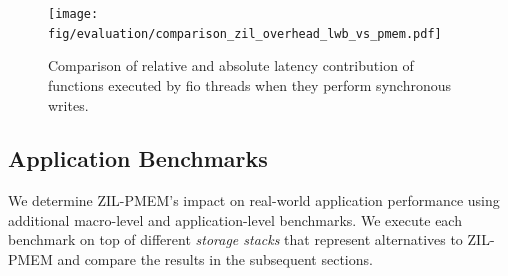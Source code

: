 \documentclass[12pt,a4paper,twoside]{book}
\begin{document}
\begin{figure}[H]
    \centering
    \texttt{[image: fig/evaluation/comparison\_zil\_overhead\_lwb\_vs\_pmem.pdf]}
    \caption{
        Comparison of relative and absolute latency contribution of functions executed by fio threads when they perform synchronous writes.
    }
    \label{fig:eval:fio4k:breakdown}
\end{figure}

\subsection{Application Benchmarks}\label{sec:eval:appbenchmarks}
We determine ZIL-PMEM's impact on real-world application performance using additional macro-level and application-level benchmarks.
We execute each benchmark on top of different \textit{storage stacks} that represent alternatives to ZIL-PMEM and compare the results in the subsequent sections.
\end{document}
